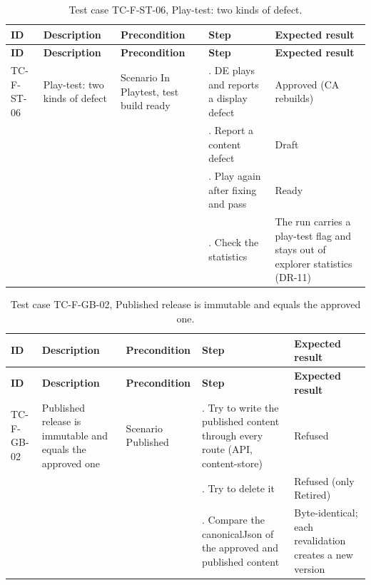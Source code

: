 {\small
\begin{longtable}{|>{\raggedright\arraybackslash}p{}|>{\raggedright\arraybackslash}p{}|>{\raggedright\arraybackslash}p{}|>{\raggedright\arraybackslash}p{}|>{\raggedright\arraybackslash}p{}|}
\caption{Test case TC-F-ST-06, Play-test: two kinds of defect.} \\
\hline
\textbf{ID} & \textbf{Description} & \textbf{Precondition} & \textbf{Step} & \textbf{Expected result} \\ \hline
\endfirsthead
\hline
\textbf{ID} & \textbf{Description} & \textbf{Precondition} & \textbf{Step} & \textbf{Expected result} \\ \hline
\endhead
TC-F-ST-06 & Play-test: two kinds of defect & Scenario In Playtest, test build ready & 1. DE plays and reports a display defect & Approved (CA rebuilds) \\ \hline
 &  &  & 2. Report a content defect & Draft \\ \hline
 &  &  & 3. Play again after fixing and pass & Ready \\ \hline
 &  &  & 4. Check the statistics & The run carries a play-test flag and stays out of explorer statistics (DR-11) \\ \hline
\end{longtable}
}

{\small
\begin{longtable}{|>{\raggedright\arraybackslash}p{}|>{\raggedright\arraybackslash}p{}|>{\raggedright\arraybackslash}p{}|>{\raggedright\arraybackslash}p{}|>{\raggedright\arraybackslash}p{}|}
\caption{Test case TC-F-GB-02, Published release is immutable and equals the approved one.} \\
\hline
\textbf{ID} & \textbf{Description} & \textbf{Precondition} & \textbf{Step} & \textbf{Expected result} \\ \hline
\endfirsthead
\hline
\textbf{ID} & \textbf{Description} & \textbf{Precondition} & \textbf{Step} & \textbf{Expected result} \\ \hline
\endhead
TC-F-GB-02 & Published release is immutable and equals the approved one & Scenario Published & 1. Try to write the published content through every route (API, content-store) & Refused \\ \hline
 &  &  & 2. Try to delete it & Refused (only Retired) \\ \hline
 &  &  & 3. Compare the canonicalJson of the approved and published content & Byte-identical; each revalidation creates a new version \\ \hline
\end{longtable}
}

